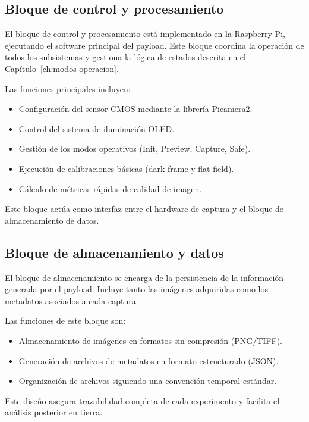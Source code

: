 \subsection{Bloque de control y procesamiento}

El bloque de control y procesamiento está implementado en la Raspberry Pi,
ejecutando el software principal del payload. Este bloque coordina la operación
de todos los subsistemas y gestiona la lógica de estados descrita en el
Capítulo~\ref{ch:modos-operacion}.

Las funciones principales incluyen:
\begin{itemize}
    \item Configuración del sensor CMOS mediante la librería Picamera2.
    \item Control del sistema de iluminación OLED.
    \item Gestión de los modos operativos (Init, Preview, Capture, Safe).
    \item Ejecución de calibraciones básicas (dark frame y flat field).
    \item Cálculo de métricas rápidas de calidad de imagen.
\end{itemize}

Este bloque actúa como interfaz entre el hardware de captura y el bloque de
almacenamiento de datos.

\subsection{Bloque de almacenamiento y datos}

El bloque de almacenamiento se encarga de la persistencia de la información
generada por el payload. Incluye tanto las imágenes adquiridas como los
metadatos asociados a cada captura.

Las funciones de este bloque son:
\begin{itemize}
    \item Almacenamiento de imágenes en formatos sin compresión (PNG/TIFF).
    \item Generación de archivos de metadatos en formato estructurado (JSON).
    \item Organización de archivos siguiendo una convención temporal estándar.
\end{itemize}

Este diseño asegura trazabilidad completa de cada experimento y facilita el
análisis posterior en tierra.

